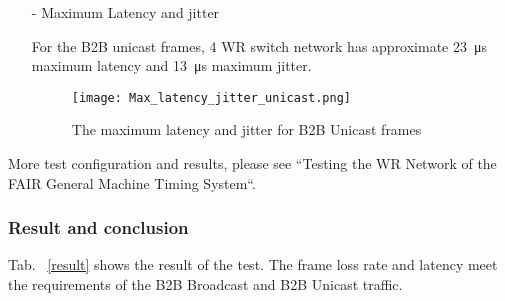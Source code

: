 \begin{itemize}
\begin{itemize}
For the B2B Unicast frames, 4 WR switch network has approximate \SI{11}{\us} average latency and \SI{0}{\us} average jitter. 

\begin{figure}[H]
   \centering   
   \texttt{[image: Avg\_latency\_jitter\_unicast.png]}
   \caption{The average latency and jitter for B2B Unicast frames}
   \label{Avg_latency_jitter_unicast}
\end{figure}

			\item[-] Maximum Latency and jitter

For the B2B unicast frames, 4 WR switch network has approximate \SI{23}{\us} maximum latency and \SI{13}{\us} maximum jitter.

\begin{figure}[H]
   \centering   
   \texttt{[image: Max\_latency\_jitter\_unicast.png]}
   \caption{The maximum latency and jitter for B2B Unicast frames}
   \label{Max_latency_jitter_unicast}
\end{figure}

		\end{itemize}
\end{itemize}

More test configuration and results, please see ``Testing the WR Network of the FAIR General Machine Timing System``.

\subsubsection{Result and conclusion}

Tab. ~\ref{result} shows the result of the test. The frame loss rate and latency meet the requirements of the B2B Broadcast and B2B Unicast traffic. 

